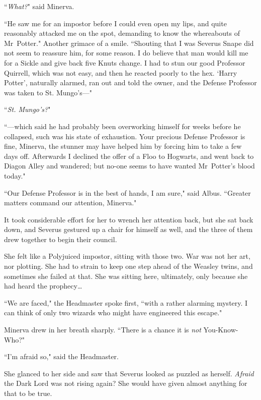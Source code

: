 ``\emph{What?}" said Minerva.

``He saw me for an impostor before I could even open my lips, and quite reasonably attacked me on the spot, demanding to know the whereabouts of Mr~Potter." Another grimace of a smile. ``Shouting that I was Severus Snape did not seem to reassure him, for some reason. I do believe that man would kill me for a Sickle and give back five Knuts change. I had to stun our good Professor Quirrell, which was not easy, and then he reacted poorly to the hex. `Harry Potter', naturally alarmed, ran out and told the owner, and the Defense Professor was taken to St. Mungo's—"

``\emph{St. Mungo's?}"

``—which said he had probably been overworking himself for weeks before he collapsed, such was his state of exhaustion. Your precious Defense Professor is fine, Minerva, the stunner may have helped him by forcing him to take a few days off. Afterwards I declined the offer of a Floo to Hogwarts, and went back to Diagon Alley and wandered; but no-one seems to have wanted Mr~Potter's blood today."

``Our Defense Professor is in the best of hands, I am sure," said Albus. ``Greater matters command our attention, Minerva."

It took considerable effort for her to wrench her attention back, but she sat back down, and Severus gestured up a chair for himself as well, and the three of them drew together to begin their council.

She felt like a Polyjuiced impostor, sitting with those two. War was not her art, nor plotting. She had to strain to keep one step ahead of the Weasley twins, and sometimes she failed at that. She was sitting here, ultimately, only because she had heard the prophecy{\ldots}

``We are faced," the Headmaster spoke first, ``with a rather alarming mystery. I can think of only two wizards who might have engineered this escape."

Minerva drew in her breath sharply. ``There is a chance it is \emph{not} You-Know-Who?"

``I'm afraid so," said the Headmaster.

She glanced to her side and saw that Severus looked as puzzled as herself. \emph{Afraid} the Dark Lord was not rising again? She would have given almost anything for that to be true.

